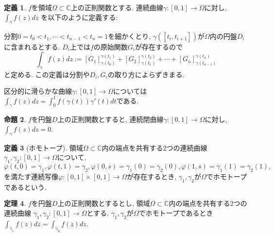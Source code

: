 \documentclass[dvipdfmx,a4paper,11pt]{article}
\newcommand{\C}{\mathbb{C}}
\theoremstyle{definition}
\newtheorem{thm}{定理}
\newtheorem{prop}[thm]{命題}
\newtheorem{dfn}[thm]{定義}
\begin{document}
\section{}
\begin{tcolorbox}[
    colback = white,
    colframe = green!35!black,
    fonttitle = \bfseries,
    breakable = true]
    \begin{dfn}
$f$を領域$\Omega \subset \C$上の正則関数とする.
連続曲線$\gamma : [0,1] \rightarrow \Omega$に対し, $\int_{\gamma} f(z) dz$
を以下のように定義する:

分割$0 = t_0 < t_1 , \cdots < t_{n-1} < t_{n} =1$を細かくとり, $\gamma([t_i, t_{i+1}]) $が$\Omega$内の円盤$D_i$に含まれるとする. $D_i$上では$f$の原始関数$G_i$が存在するので
$$
\int_{\gamma} f(z) dz :=
 [G_1]_{\gamma(t_0)}^{\gamma(t_1)}  +  [G_2]_{\gamma(t_1)}^{\gamma(t_2)} 
 + \cdots +  [G_n]_{\gamma(t_{n-1})}^{\gamma(t_n)} 
$$
と定める. この定義は分割や$D_i, G_i$の取り方によらずきまる. 
    \end{dfn}
\end{tcolorbox}
区分的に滑らかな曲線$\gamma : [0,1] \rightarrow \Omega$については
$\int_{\gamma} f(z) dz = \int_{0}^{1}f(\gamma(t)) \gamma'(t) dt$である.


\begin{tcolorbox}[
    colback = white,
    colframe = green!35!black,
    fonttitle = \bfseries,
    breakable = true]
    \begin{prop}
$f$を円盤$D$上の正則関数とすると, 連続閉曲線$\gamma : [0,1] \rightarrow \Omega$に対し, $\int_{\gamma} f(z) dz=0$.
    \end{prop}
\end{tcolorbox}

\begin{tcolorbox}[
    colback = white,
    colframe = green!35!black,
    fonttitle = \bfseries,
    breakable = true]
    \begin{dfn}[ホモトープ]
領域$\Omega \subset \C$内の端点を共有する2つの連続曲線
$\gamma_1, \gamma_2 : [0,1] \rightarrow \Omega$について,  
$$
\varphi(t,0)=\gamma_1, \varphi(t,1)=\gamma_2, 
\varphi(0,s)=\gamma_1(0) = \gamma_2(0), 
\varphi(1,s)=\gamma_1(1) = \gamma_2(1), 
$$
を満たす連続写像$\varphi : [0,1] \times [0,1] \rightarrow \Omega$が存在するとき, $\gamma_1, \gamma_2$が$\Omega$でホモトープであるという.

    \end{dfn}
\end{tcolorbox}

\begin{tcolorbox}[
    colback = white,
    colframe = green!35!black,
    fonttitle = \bfseries,
    breakable = true]
    \begin{thm}
$f$を円盤$D$上の正則関数とするとし, 領域$\Omega \subset \C$内の端点を共有する2つの連続曲線
$\gamma_1, \gamma_2 : [0,1] \rightarrow \Omega$とする. 
 $\gamma_1, \gamma_2$が$\Omega$でホモトープであるとき
$\int_{\gamma_1} f(z) dz=\int_{\gamma_2} f(z) dz$.
    \end{thm}
\end{tcolorbox}
\end{document}
